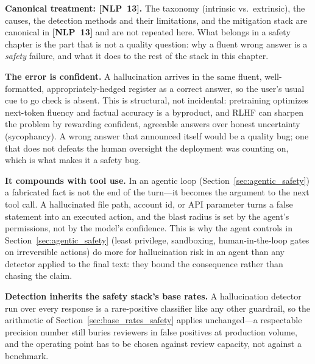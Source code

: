 \textbf{Canonical treatment: [NLP~13].} The taxonomy (intrinsic vs.\ extrinsic),
the causes, the detection methods and their limitations, and the mitigation
stack are canonical in \textbf{[NLP~13]} and are not repeated here. What belongs
in a safety chapter is the part that is not a quality question: why a fluent
wrong answer is a \emph{safety} failure, and what it does to the rest of the
stack in this chapter.

\textbf{The error is confident.} A hallucination arrives in the same fluent,
well-formatted, appropriately-hedged register as a correct answer, so the
user's usual cue to go check is absent. This is structural, not incidental:
pretraining optimizes next-token fluency and factual accuracy is a byproduct,
and RLHF can sharpen the problem by rewarding confident, agreeable answers over
honest uncertainty (sycophancy). A wrong answer that announced itself would be
a quality bug; one that does not defeats the human oversight the deployment was
counting on, which is what makes it a safety bug.

\textbf{It compounds with tool use.} In an agentic loop
(Section~\ref{sec:agentic_safety}) a fabricated fact is not the end of the
turn---it becomes the argument to the next tool call. A hallucinated file path,
account id, or API parameter turns a false statement into an executed action,
and the blast radius is set by the agent's permissions, not by the model's
confidence. This is why the agent controls in Section~\ref{sec:agentic_safety}
(least privilege, sandboxing, human-in-the-loop gates on irreversible actions)
do more for hallucination risk in an agent than any detector applied to the
final text: they bound the consequence rather than chasing the claim.

\textbf{Detection inherits the safety stack's base rates.} A hallucination
detector run over every response is a rare-positive classifier like any other
guardrail, so the arithmetic of Section~\ref{sec:base_rates_safety} applies
unchanged---a respectable precision number still buries reviewers in false
positives at production volume, and the operating point has to be chosen
against review capacity, not against a benchmark.


